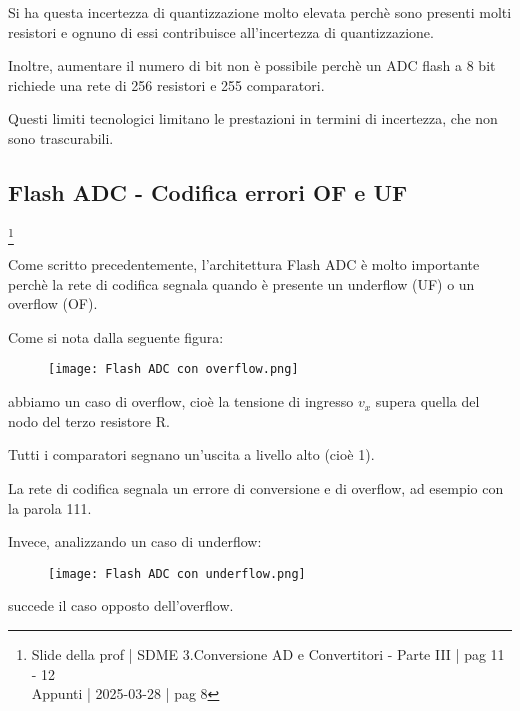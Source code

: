 Si ha questa incertezza di quantizzazione molto elevata perchè sono presenti molti resistori e ognuno di essi contribuisce all'incertezza di quantizzazione. \newline 

Inoltre, aumentare il numero di bit non è possibile perchè un ADC flash a 8 bit richiede una rete di 256 resistori e 255 comparatori. \newline 

Questi limiti tecnologici limitano le prestazioni in termini di incertezza, che non sono trascurabili. \newline 

\newpage 

\subsection{Flash ADC - Codifica errori OF e UF}
\footnote{Slide della prof | SDME 3.Conversione AD e Convertitori - Parte III | pag 11 - 12 \\  
Appunti | 2025-03-28 | pag 8}

Come scritto precedentemente, l'architettura Flash ADC è molto importante perchè la rete di codifica segnala quando 
è presente un underflow (UF) o un overflow (OF). \newline 

Come si nota dalla seguente figura: 

\begin{figure}[h]
    \centering
    \texttt{[image: Flash ADC con overflow.png]}
\end{figure}

abbiamo un caso di overflow, cioè la tensione di ingresso $v_x$ supera quella del nodo del terzo resistore R. \newline 

Tutti i comparatori segnano un'uscita a livello alto (cioè 1). \newline 

La rete di codifica segnala un errore di conversione e di overflow, ad esempio con la parola 111. \newline 

Invece, analizzando un caso di underflow: 

\begin{figure}[h]
    \centering
    \texttt{[image: Flash ADC con underflow.png]}
\end{figure}

succede il caso opposto dell'overflow. \newline 

